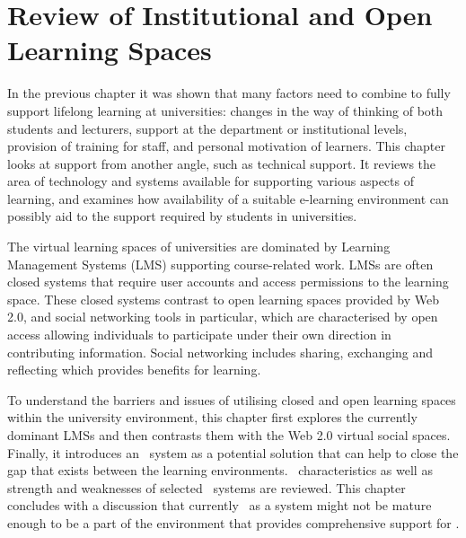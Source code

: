 \chapter{Review of Institutional and Open Learning Spaces \label{cha:systudy}}

In the previous chapter it was shown that many factors need to combine to fully
support lifelong learning at universities: changes in the way of thinking of
both students and lecturers, support at the department or institutional levels,
provision of training for staff, and personal motivation of learners. This
chapter looks at \LLLs support from another angle, such as technical support. It
reviews the area of technology and systems available for supporting various
aspects of learning, and examines how availability of a suitable e-learning
environment can possibly aid to the \LLLs support required by students in
universities.

The virtual learning spaces of universities are dominated by Learning Management
Systems (LMS) supporting course-related work. LMSs are often closed systems that
require user accounts and access permissions to the learning space. These
closed systems contrast to open learning spaces provided by Web 2.0, and social
networking tools in particular, which are characterised by open access allowing
individuals to participate under their own direction in contributing
information. Social networking includes sharing, exchanging and reflecting which
provides benefits for learning. 
 
To understand the barriers and issues of utilising closed and open learning
spaces within the university environment, this chapter first explores the
currently dominant LMSs and then contrasts them with the Web 2.0 virtual social
spaces. Finally, it introduces an \ep~system as a potential solution that can
help to close the gap that exists between the learning environments.
\ep~characteristics as well as strength and weaknesses of selected \ep~systems
are reviewed. This chapter concludes with a discussion that currently \ep~as a
system might not be mature enough to be a part of the environment that provides
comprehensive support for \LLLsn.

